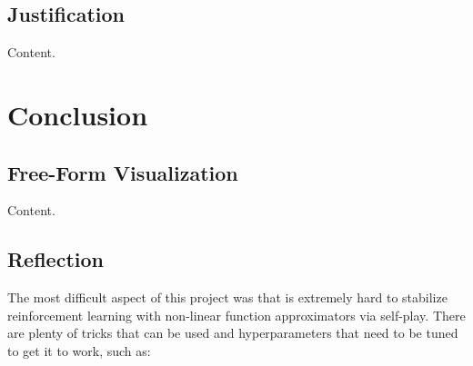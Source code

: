 \documentclass{article}
\begin{document}
\subsection{Justification}

Content.

\section{Conclusion}

\subsection{Free-Form Visualization}

Content.

\subsection{Reflection}




The most difficult aspect of this project was that is extremely hard to stabilize reinforcement
learning with non-linear function approximators via self-play. There are plenty of tricks that can
be used and hyperparameters that need to be tuned to get it to work, such as:
\end{document}
